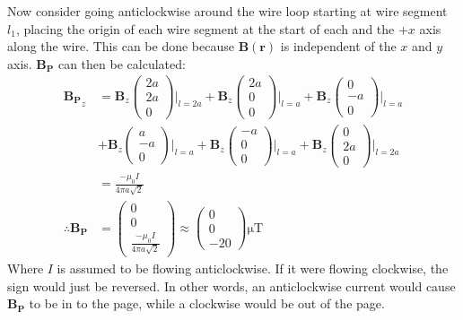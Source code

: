 \documentclass[a4paper]{scrartcl}
\begin{document}
Now consider going anticlockwise around the wire loop starting at wire segment \(l_1\), placing the origin of each wire segment at the start of each and the \(+x\) axis along the wire. This can be done because \(\mathbf{B}(\mathbf{r})\) is independent of the \(x\) and \(y\) axis. \(\mathbf{B_P}\) can then be calculated:
\begin{align*}
    \mathbf{B_P}_z &=
    \mathbf{B}_z\begin{pmatrix}2 a \\ 2 a \\ 0\end{pmatrix} \bigg|_{l = 2 a} +
    \mathbf{B}_z\begin{pmatrix}2 a \\ 0 \\ 0\end{pmatrix} \bigg|_{l = a} +
    \mathbf{B}_z\begin{pmatrix}0 \\ -a \\ 0\end{pmatrix} \bigg|_{l = a} \\
    &+ \mathbf{B}_z\begin{pmatrix}a \\ -a \\ 0\end{pmatrix} \bigg|_{l = a} +
    \mathbf{B}_z\begin{pmatrix}-a \\ 0 \\ 0\end{pmatrix} \bigg|_{l = a} +
    \mathbf{B}_z\begin{pmatrix}0 \\ 2 a \\ 0\end{pmatrix} \bigg|_{l = 2 a} \\
    &= \frac{-\mu_0 I}{4 \pi a \sqrt{2}} \\
    \therefore \mathbf{B_P} &= \begin{pmatrix}0 \\ 0 \\ \frac{-\mu_0 I}{4 \pi a \sqrt{2}}\end{pmatrix} \approx \begin{pmatrix}0 \\ 0 \\ -20\end{pmatrix}\si{\micro\tesla}
\end{align*}
Where \(I\) is assumed to be flowing anticlockwise. If it were flowing clockwise, the sign would just be reversed. In other words, an anticlockwise current would cause \(\mathbf{B_P}\) to be in to the page, while a clockwise would be out of the page.
\end{document}

